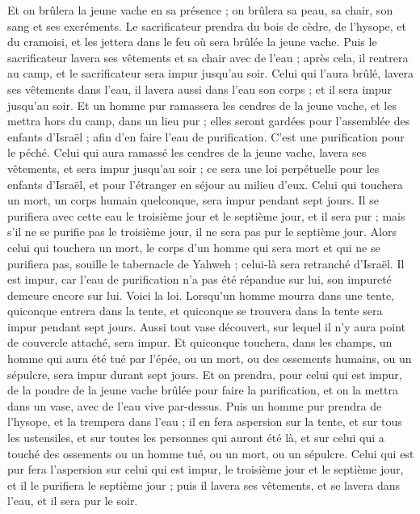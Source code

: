 \begin{multicols}{2}
Et on brûlera la jeune vache en sa présence ; on brûlera sa peau, sa chair, son sang et ses excréments.
Le sacrificateur prendra du bois de cèdre, de l'hysope, et du cramoisi, et les jettera dans le feu où sera brûlée la jeune vache.
Puis le sacrificateur lavera ses vêtements et sa chair avec de l'eau ; après cela, il rentrera au camp, et le sacrificateur sera impur jusqu'au soir.
Celui qui l'aura brûlé, lavera ses vêtements dans l'eau, il lavera aussi dans l'eau son corps ; et il sera impur jusqu'au soir.
Et un homme pur ramassera les cendres de la jeune vache, et les mettra hors du camp, dans un lieu pur ; elles seront gardées pour l'assemblée des enfants d'Israël ; afin d'en faire l'eau de purification. C'est une purification pour le péché.
Celui qui aura ramassé les cendres de la jeune vache, lavera ses vêtements, et sera impur jusqu'au soir ; ce sera une loi perpétuelle pour les enfants d'Israël, et pour l'étranger en séjour au milieu d'eux.
Celui qui touchera un mort, un corps humain quelconque, sera impur pendant sept jours.
Il se purifiera avec cette eau le troisième jour et le septième jour, et il sera pur ; mais s'il ne se purifie pas le troisième jour, il ne sera pas pur le septième jour.
Alors celui qui touchera un mort, le corps d'un homme qui sera mort et qui ne se purifiera pas, souille le tabernacle de Yahweh ; celui-là sera retranché d'Israël. Il est impur, car l'eau de purification n'a pas été répandue sur lui, son impureté demeure encore sur lui.
Voici la loi. Lorsqu'un homme mourra dans une tente, quiconque entrera dans la tente, et quiconque se trouvera dans la tente sera impur pendant sept jours.
Aussi tout vase découvert, sur lequel il n'y aura point de couvercle attaché, sera impur.
Et quiconque touchera, dans les champs, un homme qui aura été tué par l'épée, ou un mort, ou des ossements humains, ou un sépulcre, sera impur durant sept jours.
Et on prendra, pour celui qui est impur, de la poudre de la jeune vache brûlée pour faire la purification, et on la mettra dans un vase, avec de l'eau vive par-dessus.
Puis un homme pur prendra de l'hysope, et la trempera dans l'eau ; il en fera aspersion sur la tente, et sur tous les ustensiles, et sur toutes les personnes qui auront été là, et sur celui qui a touché des ossements ou un homme tué, ou un mort, ou un sépulcre.
Celui qui est pur fera l'aspersion sur celui qui est impur, le troisième jour et le septième jour, et il le purifiera le septième jour ; puis il lavera ses vêtements, et se lavera dans l'eau, et il sera pur le soir.

\end{multicols}
